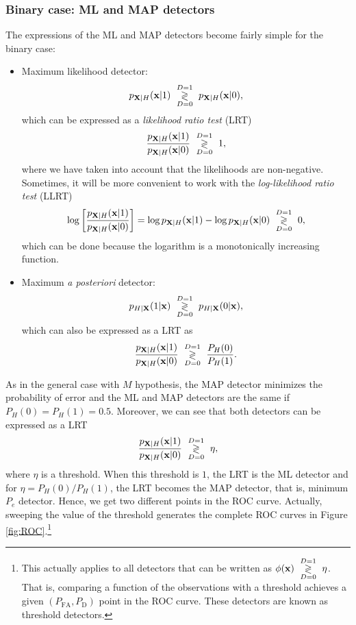 \subsubsection{Binary case: ML and MAP detectors}

The expressions of the ML and MAP detectors become fairly simple for the binary case:
\begin{itemize}
\item Maximum likelihood detector:
$$p_{{\bf X}|H}({\bf x}|1) \,\, \underset{D=0}{\overset{D=1}{\gtrless}}\,\, p_{{\bf X}|H}({\bf x}|0),$$
which can be expressed as a {\em likelihood ratio test} (LRT)
\begin{align*}
\label{eq:ML_LRT}
\frac{p_{{\bf X}|H}({\bf x}|1)}{p_{{\bf X}|H}({\bf x}|0)} \,\, \underset{D=0}{\overset{D=1}{\gtrless}}\,\, 1,
\end{align*}
where we have taken into account that the likelihoods are non-negative. Sometimes, it will be more convenient to work with the {\em log-likelihood ratio test} (LLRT)
\begin{equation}
\label{eq:LLRT}
\log \left[ \frac{p_{{\bf X}|H}({\bf x}|1)}{p_{{\bf X}|H}({\bf x}|0)} \right] 
	= \log p_{{\bf X}|H}({\bf x}|1) - \log p_{{\bf X}|H}({\bf x}|0) \,\, \underset{D=0}{\overset{D=1}{\gtrless}}\,\, 0,
\end{equation}
which can be done because the logarithm is a monotonically increasing function.
\item Maximum \emph{a posteriori} detector:
$$p_{H|{\bf X}}(1|{\bf x}) \,\, \underset{D=0}{\overset{D=1}{\gtrless}}\,\, p_{H|{\bf X}}(0|{\bf x}),$$
which can also be expressed as a LRT as
\begin{align} 
\frac{p_{{\bf X}|H}({\bf x}|1)}{p_{{\bf X}|H}({\bf x}|0)} 
	\,\, \underset{D=0}{\overset{D=1}{\gtrless}}\,\, \frac{P_H(0)}{P_H(1)}.
\end{align}
\end{itemize}

As in the general case with $M$ hypothesis, the MAP detector minimizes the probability of error and the ML and MAP detectors are the same if $P_H(0)=P_H(1)=0.5$. Moreover, we can see that both detectors can be expressed as a LRT
\begin{align} 
\label{eq:def_LRT}
\frac{p_{{\bf X}|H}({\bf x}|1)}{p_{{\bf X}|H}({\bf x}|0)} \,\, \underset{D=0}{\overset{D=1}{\gtrless}}\,\, \eta,
\end{align}
where $\eta$ is a threshold. When this threshold is $1$, the LRT is the ML detector and for $\eta = P_H(0)/P_H(1)$, the LRT becomes the MAP detector, that is, minimum $P_e$ detector. Hence, we get two different points in the ROC curve. Actually, sweeping the value of the threshold generates the complete ROC curves in Figure \ref{fig:ROC}.\footnote{This actually applies to all detectors that can be written as $\phi({\bf x}) \,\, \underset{D=0}{\overset{D=1}{\gtrless}}\,\, \eta$. That is, comparing a function of the observations with a threshold achieves a given $(P_\text{FA},P_\text{D})$ point in the ROC curve. These detectors are known as threshold detectors.}



